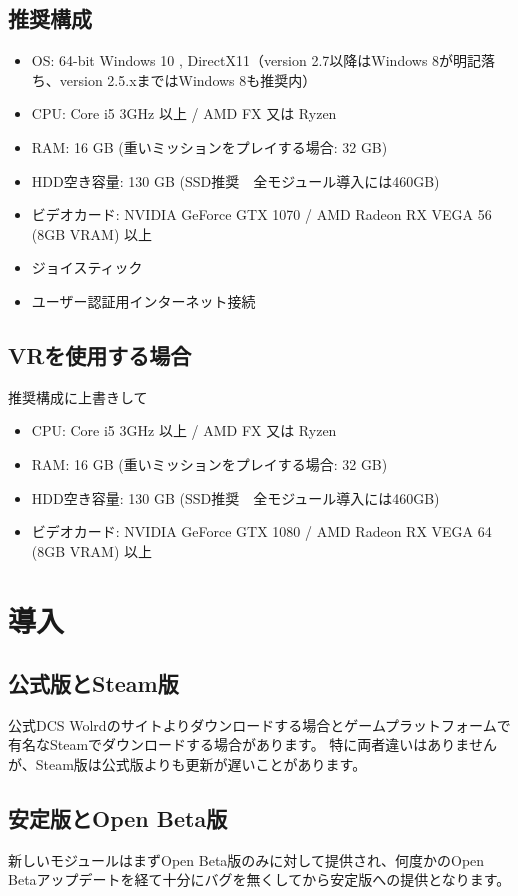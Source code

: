 \subsection{推奨構成}
\begin{itemize}
  \item OS: 64-bit Windows 10 , DirectX11（version 2.7以降はWindows 8が明記落ち、version 2.5.xまではWindows 8も推奨内）
  \item CPU: Core i5 3GHz 以上 / AMD FX 又は Ryzen
  \item RAM: 16 GB (重いミッションをプレイする場合: 32 GB)
  \item HDD空き容量: 130 GB (SSD推奨　全モジュール導入には460GB)
  \item ビデオカード: NVIDIA GeForce GTX 1070 / AMD Radeon RX VEGA 56 (8GB VRAM) 以上
  \item ジョイスティック
  \item ユーザー認証用インターネット接続
\end{itemize}

\subsection{VRを使用する場合}
推奨構成に上書きして
\begin{itemize}
  \item CPU: Core i5 3GHz 以上 / AMD FX 又は Ryzen
  \item RAM: 16 GB (重いミッションをプレイする場合: 32 GB)
  \item HDD空き容量: 130 GB (SSD推奨　全モジュール導入には460GB)
  \item ビデオカード: NVIDIA GeForce GTX 1080 / AMD Radeon RX VEGA 64 (8GB VRAM) 以上
\end{itemize}

\section{導入}
\subsection{公式版とSteam版}
公式DCS Wolrdのサイトよりダウンロードする場合とゲームプラットフォームで有名なSteamでダウンロードする場合があります。
特に両者違いはありませんが、Steam版は公式版よりも更新が遅いことがあります。

\subsection{安定版とOpen Beta版}
新しいモジュールはまずOpen Beta版のみに対して提供され、何度かのOpen Betaアップデートを経て十分にバグを無くしてから安定版への提供となります。
